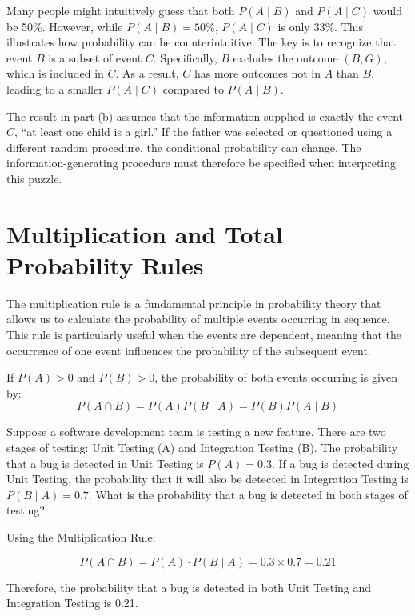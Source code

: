 \begin{remark}
    Many people might intuitively guess that both \( P(A \mid B) \) and \( P(A \mid C) \) would be 50\%. However, while \( P(A \mid B) = 50\%\), \( P(A \mid C) \) is only 33\%. This illustrates how probability can be counterintuitive. The key is to recognize that event \( B \) is a subset of event \( C \). Specifically, \( B \) excludes the outcome \( (B, G) \), which is included in \( C \). As a result, \( C \) has more outcomes not in \( A \) than \( B \), leading to a smaller \( P(A \mid C) \) compared to \( P(A \mid B) \).

    The result in part (b) assumes that the information supplied is exactly the event \(C\), “at least one child is a girl.” If the father was selected or questioned using a different random procedure, the conditional probability can change. The information-generating procedure must therefore be specified when interpreting this puzzle.
\end{remark}

\section{Multiplication and Total Probability Rules}
The multiplication rule is a fundamental principle in probability theory that allows us to calculate the probability of multiple events occurring in sequence. This rule is particularly useful when the events are dependent, meaning that the occurrence of one event influences the probability of the subsequent event.

\begin{theorem}
    If \(P(A)>0\) and \(P(B)>0\), the probability of both events occurring is given by:
    \[
    P(A \cap B) = P(A) P(B \mid A) = P(B) P(A \mid B)
    \]
\end{theorem}

\begin{example}
    Suppose a software development team is testing a new feature. There are two stages of testing: Unit Testing (A) and Integration Testing (B). The probability that a bug is detected in Unit Testing is $P(A)=0.3$. If a bug is detected during Unit Testing, the probability that it will also be detected in Integration Testing is $P(B \mid A) = 0.7$. What is the probability that a bug is detected in both stages of testing?
\end{example}

\begin{solution}
    Using the Multiplication Rule:

\[
P(A \cap B)=P(A) \cdot P(B \mid A)=0.3 \times 0.7=0.21
\]


Therefore, the probability that a bug is detected in both Unit Testing and Integration Testing is 0.21.
\leavevmode\end{solution}


